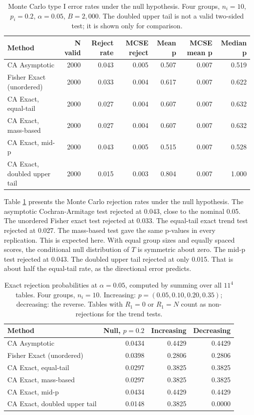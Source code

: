 \documentclass[
  11pt,
]{article}
\begin{document}
\begin{table}[!h]
\centering
\caption{\label{tab:table-null}Monte Carlo type I error rates under the null hypothesis. Four groups, $n_i = 10$, $p_i = 0.2$, $\alpha = 0.05$, $B = 2{,}000$. The doubled upper tail is not a valid two-sided test; it is shown only for comparison.}
\centering
\fontsize{9}{11}\selectfont
\begin{tabular}[t]{lrrrrrr}
\toprule
Method & N valid & Reject rate & MCSE reject & Mean p & MCSE mean p & Median p\\
\midrule
CA Asymptotic & 2000 & 0.043 & 0.005 & 0.507 & 0.007 & 0.519\\
Fisher Exact (unordered) & 2000 & 0.033 & 0.004 & 0.617 & 0.007 & 0.622\\
CA Exact, equal-tail & 2000 & 0.027 & 0.004 & 0.607 & 0.007 & 0.632\\
CA Exact, mass-based & 2000 & 0.027 & 0.004 & 0.607 & 0.007 & 0.632\\
CA Exact, mid-p & 2000 & 0.043 & 0.005 & 0.515 & 0.007 & 0.528\\
\addlinespace
CA Exact, doubled upper tail & 2000 & 0.015 & 0.003 & 0.804 & 0.007 & 1.000\\
\bottomrule
\end{tabular}
\end{table}

Table \ref{tab:table-null} presents the Monte Carlo
rejection rates under the null hypothesis. The asymptotic Cochran-Armitage test
rejected at 0.043, close to the nominal 0.05.
The unordered Fisher exact test rejected at
0.033. The equal-tail exact trend test
rejected at 0.027. The mass-based test gave
the same p-values in every replication. This is expected
here. With equal group sizes and equally spaced scores,
the conditional null distribution of \(T\) is symmetric
about zero. The mid-p test rejected at 0.043.
The doubled upper tail rejected at only 0.015.
That is about half the equal-tail rate, as the
directional error predicts.

\begin{table}[!h]
\centering
\caption{\label{tab:table-exact}Exact rejection probabilities at $\alpha = 0.05$, computed by summing over all $11^4$ tables. Four groups, $n_i = 10$. Increasing: $p = (0.05, 0.10, 0.20, 0.35)$; decreasing: the reverse. Tables with $R_1 = 0$ or $R_1 = N$ count as non-rejections for the trend tests.}
\centering
\fontsize{9}{11}\selectfont
\begin{tabular}[t]{lrrr}
\toprule
Method & Null, $p = 0.2$ & Increasing & Decreasing\\
\midrule
CA Asymptotic & 0.0434 & 0.4429 & 0.4429\\
Fisher Exact (unordered) & 0.0398 & 0.2806 & 0.2806\\
CA Exact, equal-tail & 0.0297 & 0.3825 & 0.3825\\
CA Exact, mass-based & 0.0297 & 0.3825 & 0.3825\\
CA Exact, mid-p & 0.0434 & 0.4429 & 0.4429\\
\addlinespace
CA Exact, doubled upper tail & 0.0148 & 0.3825 & 0.0000\\
\bottomrule
\end{tabular}
\end{table}
\end{document}
